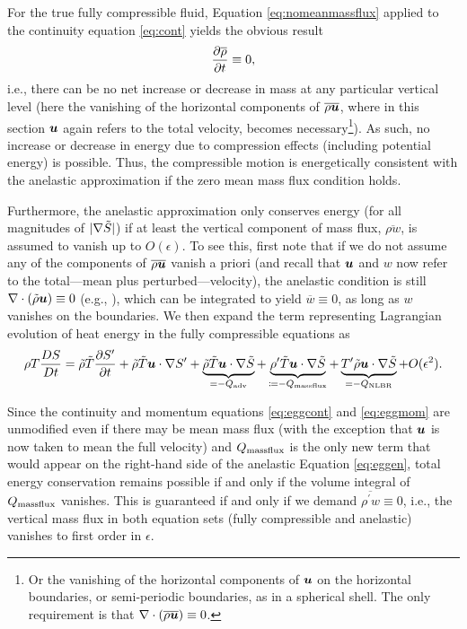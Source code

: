 \documentclass[12pt]{article}
\newcommand{\heatnlbr}{Q_{\rm NLBR}}
\newcommand{\heatmassflux}{Q_{\rm massflux}}
\newcommand{\heatadv}{Q_{\rm adv}}
\begin{document}
For the true fully compressible fluid, Equation \eqref{eq:nomeanmassflux} applied to the continuity equation \eqref{eq:cont} yields the obvious result
\begin{align}\label{eq:drhodt0}
	\frac{\partial\overline{\rho}}{\partial t}\equiv0,
\end{align}
i.e., there can be no net increase or decrease in mass at any particular vertical level (here the vanishing of the horizontal components of $\overline{\rho\bm{u}}$, where in this section $\bm{u}$ again refers to the total velocity, becomes necessary\footnote{Or the vanishing of the horizontal components of $\bm{u}$ on the horizontal boundaries, or semi-periodic boundaries, as in a spherical shell. The only requirement is that $\nabla\cdot(\overline{\rho\bm{u}})\equiv0$.}). As such, no increase or decrease in energy due to compression effects (including potential energy) is possible. Thus, the compressible motion is energetically consistent with the anelastic approximation if the zero mean mass flux condition holds. 

Furthermore, the anelastic approximation only conserves energy (for all magnitudes of $|\nabla\tilde{S}|$) if at least the vertical component of mass flux, $\overline{\rho w}$, is assumed to vanish up to $O(\epsilon)$. To see this, first note that if we do not assume any of the components of $\overline{\rho \bm{u}}$ vanish a priori (and recall that $\bm{u}$ and $w$ now refer to the total---mean plus perturbed---velocity), the anelastic condition is still $\nabla\cdot(\tilde{\rho}\bm{u})\equiv0$ (e.g., \citealt{Ogura1962}), which can be integrated to yield $\overline{w}\equiv0$, as long as $w$ vanishes on the boundaries. We then expand the term representing Lagrangian evolution of heat energy in the fully compressible equations as
\begin{align}\label{eq:enlhsfirstorder}
	\rho T\frac{DS}{Dt} =\rhotilde\tmptilde\pderiv{\entrprime}{t}  + \rhotilde\tmptilde\ugrad \entrprime + \underbrace{\rhotilde\tmptilde \ugrad \entrtilde}_{=-\heatadv}+ \underbrace{ \rhoprime\tmptilde \ugrad\entrtilde }_{\define- \heatmassflux} + \underbrace{ \tmpprime\rhotilde \ugrad\entrtilde }_{=- \heatnlbr} + O(\epsilon^2). 
\end{align}

Since the continuity and momentum equations \eqref{eq:eggcont} and \eqref{eq:eggmom} are unmodified even if there may be mean mass flux (with the exception that $\bm{u}$ is now taken to mean the full velocity) and  $\heatmassflux$ is the only new term that would appear on the right-hand side of the anelastic Equation \eqref{eq:eggen}, total energy conservation remains possible if and only if the volume integral of $\heatmassflux$ vanishes. This is guaranteed if and only if we demand $\overline{\rho^\prime w}\equiv0$, i.e., the vertical mass flux in both equation sets (fully compressible and anelastic) vanishes to first order in $\epsilon$.
\end{document}

